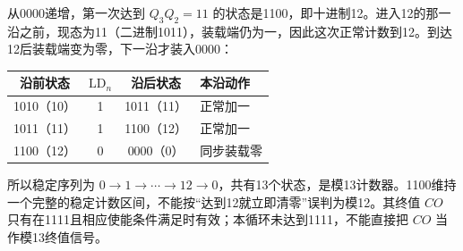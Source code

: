 \documentclass[UTF8,fontset=none,zihao=-4,a4paper]{ctexart}
\begin{document}
从0000递增，第一次达到 $Q_3Q_2=11$ 的状态是1100，即十进制12。进入12的那一沿之前，现态为11（二进制1011），装载端仍为一，因此这次正常计数到12。到达12后装载端变为零，下一沿才装入0000：
\begin{center}
\begin{tabular}{c c c l}
\toprule 沿前状态 & $\mathrm{LD}_n$ & 沿后状态 & 本沿动作\\\midrule
1010（10）&1&1011（11）&正常加一\\
1011（11）&1&1100（12）&正常加一\\
1100（12）&0&0000（0）&同步装载零\\\bottomrule
\end{tabular}
\end{center}
所以稳定序列为 $0\to1\to\cdots\to12\to0$，共有13个状态，是模13计数器。1100维持一个完整的稳定计数区间，不能按“达到12就立即清零”误判为模12。其终值 $CO$ 只有在1111且相应使能条件满足时有效；本循环未达到1111，不能直接把 $CO$ 当作模13终值信号。
\end{document}
